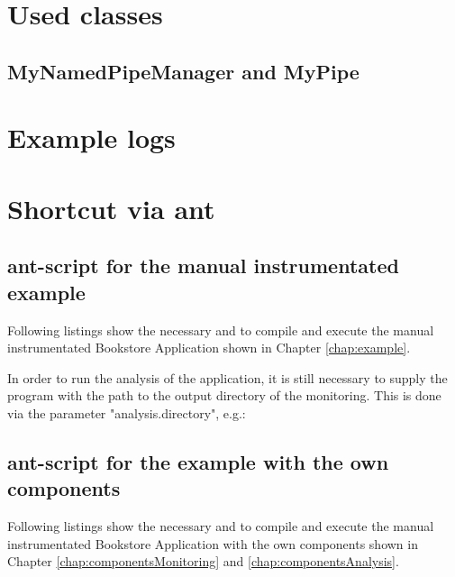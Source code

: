 \appendix
  \chapter{Used classes}
    \section{MyNamedPipeManager and MyPipe}
      \setJavaCodeListing
      

      \setJavaCodeListing
      

  \chapter{Example logs}
	
  \chapter{Shortcut via ant}
    \section{ant-script for the manual instrumentated example}
      Following listings show the necessary  and  to compile and execute the manual instrumentated Bookstore Application shown in Chapter \ref{chap:example}.
      \setXMLListing
      
      
      In order to run the analysis of the application, it is still necessary to supply the program with the path to the output directory of the monitoring. This is done via the parameter "analysis.directory", e.g.:
      \setBashListing
      

    \section{ant-script for the example with the own components}
      Following listings show the necessary  and  to compile and execute the manual instrumentated Bookstore Application with the own components shown in Chapter \ref{chap:componentsMonitoring} and \ref{chap:componentsAnalysis}.
      \setXMLListing
      
      

